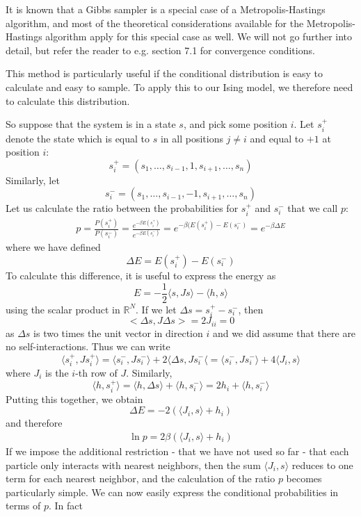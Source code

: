 \documentclass[a4paper, draft]{article}
\theoremstyle{own}
\theoremstyle{remark}
\newcommand{\R}{\mathbb{R}}
\begin{document}
It is known that a Gibbs sampler is a special case of a Metropolis-Hastings algorithm, and most of the theoretical considerations available for the Metropolis-Hastings algorithm apply for this special case as well. We will not go further into detail, but refer the reader to e.g. \cite{RobertCasella1999} section 7.1 for convergence conditions. 

This method is particularly useful if the conditional distribution is easy to calculate and easy to sample. To apply this to our Ising model, we therefore need to calculate this distribution.

So suppose that the system is in a state $s$, and pick some position $i$. Let $s_i^+$ denote the state which is equal to $s$ in all positions $j \neq i$ and equal to $+1$ at position $i$:
$$
s_i^+ = (s_1, \dots, s_{i-1}, 1, s_{i+1}, \dots, s_n)
$$
Similarly, let
$$
s_i^- = (s_1, \dots, s_{i-1}, -1, s_{i+1}, \dots, s_n)
$$
Let us calculate the ratio between the probabilities for $s_i^+$ and $s_i^-$ that we call $p$:
\begin{align*}
p = \frac{P(s_i^+)}{P(s_i^-)} = \frac{e^{-\beta E(s_i^+)}}{e^{-\beta E(s_i^-)}}
= e^{-\beta(E(s_i^+) - E(s_i^-)} = e^{-\beta \Delta E}
\end{align*}
where we have defined
$$
\Delta E = E(s_i^+) - E(s_i^-)
$$
To calculate this difference, it is useful to express the energy as
$$
E = - \frac{1}{2} \langle s, Js \rangle - \langle h,s \rangle
$$
using the scalar product in $\R^N$. If we let $\Delta s = s_i^+ - s_i^-$, then 
$$
<\Delta s , J \Delta s> = 2 J_{ii} = 0
$$
as $\Delta s$ is two times the unit vector in direction $i$ and we did assume that there are no self-interactions. Thus we can write
$$
\langle s_i^+, J s_i^+ \rangle = \langle s_i^-, J s_i^- \rangle 
+ 2 \langle \Delta s, J s_i^- \langle = \langle s_i^-, J s_i^- \rangle 
+ 4 \langle J_i, s \rangle
$$
where $J_i$ is the $i$-th row of $J$. Similarly,
$$
\langle h, s_i^+ \rangle = \langle h, \Delta s  \rangle + \langle h, s_i^- \rangle
= 2 h_i + \langle h, s_i^- \rangle
$$
Putting this together, we obtain
$$
\Delta E = - 2 ( \langle J_i, s \rangle + h_i)
$$
and therefore
\begin{align}\label{eq:gibbsprobabilityratio}
\ln p =  2\beta ( \langle J_i, s \rangle + h_i)
\end{align}
If we impose the additional restriction - that we have not used so far - that each particle only interacts with nearest neighbors, then the sum $\langle J_i, s \rangle$ reduces to one term for each nearest neighbor, and the calculation of the ratio $p$ becomes particularly simple. We can now easily express the conditional probabilities in terms of $p$. In fact
\end{document}
